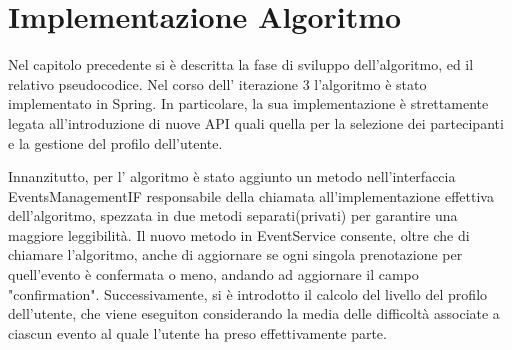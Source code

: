 \section{Implementazione Algoritmo}

Nel capitolo precedente si è descritta la fase di sviluppo dell'algoritmo, ed il relativo pseudocodice.
Nel corso dell' iterazione 3 l'algoritmo è stato implementato in Spring. In particolare, la sua implementazione è strettamente legata
all'introduzione di nuove API quali quella per la selezione dei partecipanti e la gestione del profilo dell'utente.

Innanzitutto, per l' algoritmo è stato aggiunto un metodo nell'interfaccia EventsManagementIF responsabile della chiamata all'implementazione
effettiva dell'algoritmo, spezzata in due metodi separati(privati) per garantire una maggiore leggibilità. Il nuovo metodo
in EventService consente, oltre che di chiamare l'algoritmo, anche di aggiornare se ogni singola prenotazione per quell'evento 
è confermata o meno, andando ad aggiornare il campo "confirmation".
Successivamente, si è introdotto il calcolo del livello del profilo dell'utente, che viene eseguiton considerando la media delle difficoltà
associate a ciascun evento al quale l'utente ha preso effettivamente parte.



